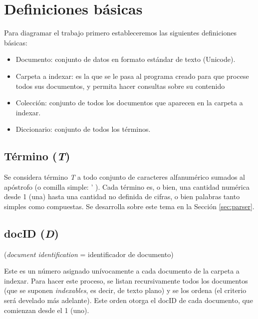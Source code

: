 \section{Definiciones básicas}

Para diagramar el trabajo primero estableceremos las siguientes definiciones básicas:
\begin{itemize}


\item Documento: conjunto de datos en formato estándar de texto (Unicode).

\item Carpeta a indexar: es la que se le pasa al programa creado para que procese todos sus documentos, y permita hacer consultas sobre su contenido

\item Colección: conjunto de todos los documentos que aparecen en la carpeta a indexar.

\item Diccionario: conjunto de todos los términos.

\end{itemize}


\subsection{Término (\textnormal{\itshape T})}

 
Se considera término \textit{T} a todo conjunto de caracteres alfanumérico sumados al apóstrofo (o comilla simple: ' ). Cada término es, o bien, una cantidad numérica desde 1 (una) hasta una cantidad no definida de cifras, o bien palabras tanto simples como compuestas. Se desarrolla sobre este tema en la Sección \ref{sec:parser}.


\subsection{docID (\textnormal{\itshape D})}
\noindent (\textit{document identification} = identificador de documento)

Este es un número asignado unívocamente a cada documento de la carpeta a indexar. Para hacer este proceso, se listan recursivamente todos los documentos (que se suponen \textit{indexables}, es decir, de texto plano) y se los ordena (el criterio será develado más adelante). Este orden otorga el docID de cada documento, que comienzan desde el 1 (uno).


